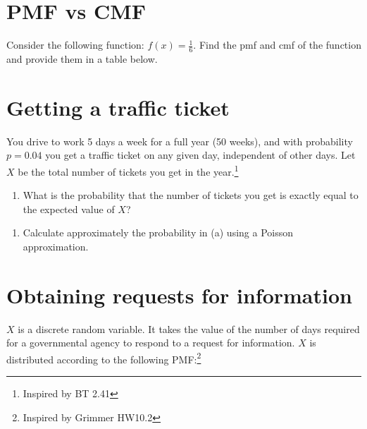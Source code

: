 \documentclass[
]{article}
\begin{document}
\section{PMF vs CMF}\label{pmf-vs-cmf}

Consider the following function: \(f(x) = \frac{1}{6}\). Find the pmf
and cmf of the function and provide them in a table below.

\hfill\break
\hfill\break
\hfill\break
\hfill\break
\hfill\break
\hfill\break
\hfill\break

\section{Getting a traffic ticket}\label{getting-a-traffic-ticket}

You drive to work 5 days a week for a full year (50 weeks), and with
probability \(p=0.04\) you get a traffic ticket on any given day,
independent of other days. Let \(X\) be the total number of tickets you
get in the year.\footnote{Inspired by BT 2.41}

\begin{enumerate}
\def\labelenumi{\alph{enumi}.}
\item
  What is the probability that the number of tickets you get is exactly
  equal to the expected value of \(X\)?
\end{enumerate}

\hfill\break
\hfill\break
\hfill\break
\hfill\break
\hfill\break
\hfill\break
\hfill\break

\begin{enumerate}
\def\labelenumi{\alph{enumi}.}
\item
  Calculate approximately the probability in (a) using a Poisson
  approximation.
\end{enumerate}

\hfill\break
\hfill\break
\hfill\break
\hfill\break
\hfill\break
\hfill\break
\hfill\break

\hfill\break
\hfill\break
\hfill\break
\hfill\break
\hfill\break
\hfill\break
\hfill\break

\section{Obtaining requests for
information}\label{obtaining-requests-for-information}

\(X\) is a discrete random variable. It takes the value of the number of
days required for a governmental agency to respond to a request for
information. \(X\) is distributed according to the following
PMF:\footnote{Inspired by Grimmer HW10.2}
\end{document}
